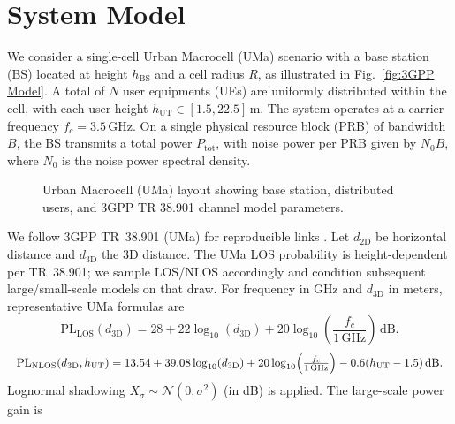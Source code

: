\documentclass[conference]{IEEEtran}
\begin{document}
\section{System Model}
We consider a single-cell Urban Macrocell (UMa) scenario with a base station (BS) located at height $h_{\mathrm{BS}}$ and a cell radius $R$, as illustrated in Fig.~\ref{fig:3GPP Model}. A total of $N$ user equipments (UEs) are uniformly distributed within the cell, with each user height $h_{\mathrm{UT}}\in[1.5,22.5]$\,m. The system operates at a carrier frequency $f_c = 3.5$\,GHz. On a single physical resource block (PRB) of bandwidth $B$, the BS transmits a total power $P_{\mathrm{tot}}$, with noise power per PRB given by $N_0 B$, where $N_0$ is the noise power spectral density.
\begin{figure}[t]
  \centering
  \resizebox{\columnwidth}{!}{}
  \caption{Urban Macrocell (UMa) layout showing base station, distributed users, and 3GPP TR 38.901 channel model parameters.}
\end{figure}
We follow 3GPP TR~38.901 (UMa) for reproducible links \cite{etis2024}. Let $d_{2\mathrm{D}}$ be horizontal distance and $d_{3\mathrm{D}}$ the 3D distance. The UMa LOS probability is height-dependent per TR~38.901; we sample LOS/NLOS accordingly and condition subsequent large/small-scale models on that draw. For frequency in GHz and $d_{3\mathrm{D}}$ in meters, representative UMa formulas are
\begin{equation}
\mathrm{PL}_{\mathrm{LOS}}(d_{3\mathrm{D}})=28+22\log_{10}(d_{3\mathrm{D}})+20\log_{10}\!\left(\frac{f_c}{1\,\mathrm{GHz}}\right)\,\mathrm{dB}.
\end{equation}
\begin{equation}
\resizebox{\columnwidth}{!}{$
\mathrm{PL}_{\mathrm{NLOS}}(d_{3\mathrm{D}},h_{\mathrm{UT}})=13.54+39.08\log_{10}(d_{3\mathrm{D}})+20\log_{10}\!\left(\frac{f_c}{1\,\mathrm{GHz}}\right)-0.6(h_{\mathrm{UT}}-1.5)\,\mathrm{dB}.
$}
\end{equation}
Lognormal shadowing $X_\sigma\sim\mathcal{N}(0,\sigma^2)$ (in dB) is applied. The large-scale power gain is
\end{document}
